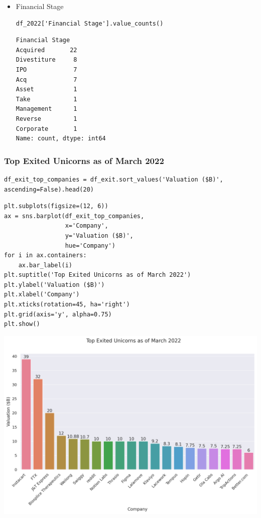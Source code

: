 \documentclass[a4paper,12pt]{article}
\begin{document}
\begin{itemize}
\item Financial Stage

\begin{verbatim}
df_2022['Financial Stage'].value_counts()
\end{verbatim}

\label{}
\begin{verbatim}
Financial Stage
Acquired       22
Divestiture     8
IPO             7
Acq             7
Asset           1
Take            1
Management      1
Reverse         1
Corporate       1
Name: count, dtype: int64
\end{verbatim}
\end{itemize}
\subsubsection{Top Exited Unicorns as of March 2022}
\label{sec:org1825238}

\begin{verbatim}
df_exit_top_companies = df_exit.sort_values('Valuation ($B)', ascending=False).head(20)
\end{verbatim}

\begin{verbatim}
plt.subplots(figsize=(12, 6))
ax = sns.barplot(df_exit_top_companies,
                 x='Company',
                 y='Valuation ($B)',
                 hue='Company')
for i in ax.containers:
    ax.bar_label(i)
plt.suptitle('Top Exited Unicorns as of March 2022')
plt.ylabel('Valuation ($B)')
plt.xlabel('Company')
plt.xticks(rotation=45, ha='right')
plt.grid(axis='y', alpha=0.75)
plt.show()
\end{verbatim}

\begin{center}
\includegraphics[width=.9\linewidth]{./.ob-jupyter/133c08bd485e5a0c21963dce921420f21661f265.png}
\label{}
\end{center}
\end{document}
